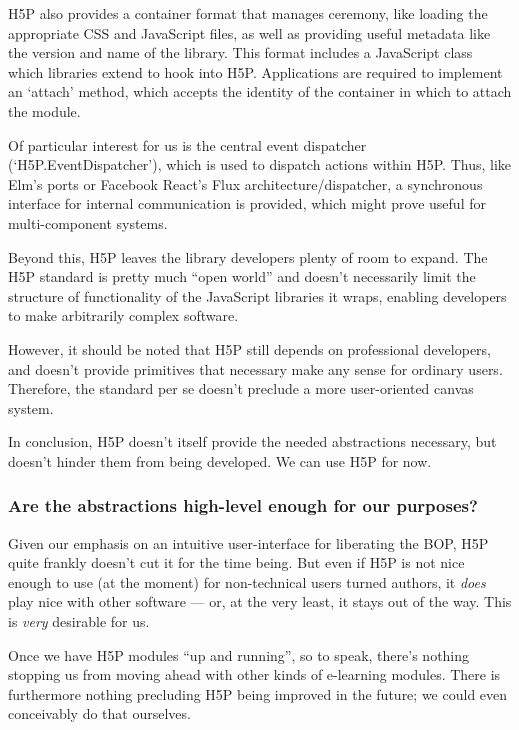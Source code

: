 H5P also provides a container format that manages ceremony, like loading
the appropriate CSS and JavaScript files, as well as providing useful metadata 
like the version and name of the library. This format includes a JavaScript 
class which libraries extend to hook into H5P. Applications are required to 
implement an `attach' method, which accepts the identity of the container in 
which to attach the module.

Of particular interest for us is the central event dispatcher
(`H5P.EventDispatcher')\cite{h5pdispatch}, which is used to dispatch actions
within H5P. Thus, like Elm's ports\cite{elmports} or Facebook React's Flux
architecture/dispatcher\cite{fluxdispatch}, a synchronous interface for 
internal communication is provided, which might prove useful for 
multi-component systems.

Beyond this, H5P leaves the library developers plenty of room to expand. The 
H5P standard is pretty much ``open world'' and doesn't necessarily limit the 
structure of functionality of the JavaScript libraries it wraps, enabling 
developers to make arbitrarily complex software.

However, it should be noted that H5P still depends on professional
developers, and doesn't provide primitives that necessary make any sense for
ordinary users. Therefore, the standard per se doesn't preclude a more
user-oriented canvas system.

In conclusion, H5P doesn't itself provide the needed abstractions necessary, but
doesn't hinder them from being developed. We can use H5P for now.

\subsubsection{Are the abstractions high-level enough for our purposes?}

Given our emphasis on an intuitive user-interface for liberating the BOP, H5P 
quite frankly doesn't cut it for the time being. But even if H5P is not nice 
enough to use (at the moment) for non-technical users turned authors, it 
\emph{does} play nice with other software --- or, at the very least, it stays 
out of the way. This is \emph{very} desirable for us.

Once we have H5P modules ``up and running'', so to speak, there's nothing 
stopping us from moving ahead with other kinds of e-learning modules. There is 
furthermore nothing precluding H5P being improved in the future; we could even 
conceivably do that ourselves.

